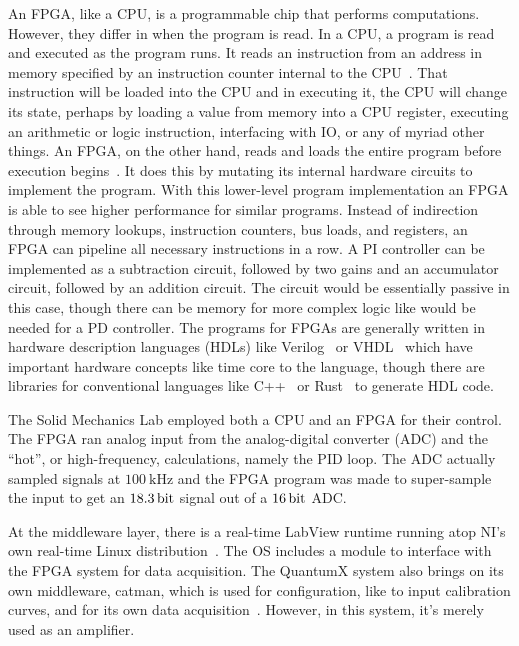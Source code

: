\documentclass[english,12pt,a4paper,pdftex,eng,utf8]{aaltothesis}
\begin{document}
An FPGA, like a CPU, is a programmable chip that performs computations.  However, they differ in when the program is read.  In a CPU, a program is read and executed as the program runs.  It reads an instruction from an address in memory specified by an instruction counter internal to the CPU~\cite{Malvino1999}.  That instruction will be loaded into the CPU and in executing it, the CPU will change its state, perhaps by loading a value from memory into a CPU register, executing an arithmetic or logic instruction, interfacing with IO, or any of myriad other things.  An FPGA, on the other hand, reads and loads the entire program before execution begins~\cite{MeyerBaese2014a,Kaur2009}.  It does this by mutating its internal hardware circuits to implement the program.  With this lower-level program implementation an FPGA is able to see higher performance for similar programs.  Instead of indirection through memory lookups, instruction counters, bus loads, and registers, an FPGA can pipeline all necessary instructions in a row.  A PI controller can be implemented as a subtraction circuit, followed by two gains and an accumulator circuit, followed by an addition circuit.  The circuit would be essentially passive in this case, though there can be memory for more complex logic like would be needed for a PD controller.  The programs for FPGAs are generally written in hardware description languages (HDLs) like Verilog~\cite{IEEE1800-2023} or VHDL~\cite{IEEE1070-2000} which have important hardware concepts like time core to the language, though there are libraries for conventional languages like C++~\cite{VivadoHLS} or Rust~\cite{RustHDL} to generate HDL code.

The Solid Mechanics Lab employed both a CPU and an FPGA for their control.  The FPGA ran  analog input from the analog-digital converter (ADC) and the ``hot'', or high-frequency, calculations, namely the PID loop.  The ADC actually sampled signals at $\qty{100}{\kilo\hertz}$ and the FPGA program was made to super-sample the input to get an $\qty{18.3}{\bit}$ signal out of a $\qty{16}{\bit}$ ADC.\

At the middleware layer, there is a real-time LabView runtime running atop NI's own real-time Linux distribution~\cite{NICompactRIO}.  The OS includes a module to interface with the FPGA system for data acquisition.  The QuantumX system also brings on its own middleware, catman, which is used for configuration, like to input calibration curves, and for its own data acquisition~\cite{HBKcatman}.  However, in this system, it's merely used as an amplifier.
\end{document}
